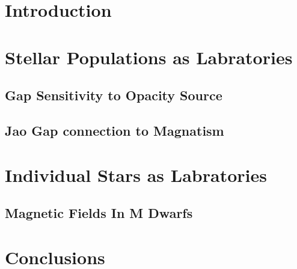 \documentclass{GuariniThesis}
\begin{document}
\makePrelim

\part{Introduction}


\part{Stellar Populations as Labratories}


\chapter{Gap Sensitivity to Opacity Source}


\chapter{Jao Gap connection to Magnatism}


\part{Individual Stars as Labratories}
\chapter{Magnetic Fields In M Dwarfs}




\part{Conclusions}



\end{document}
